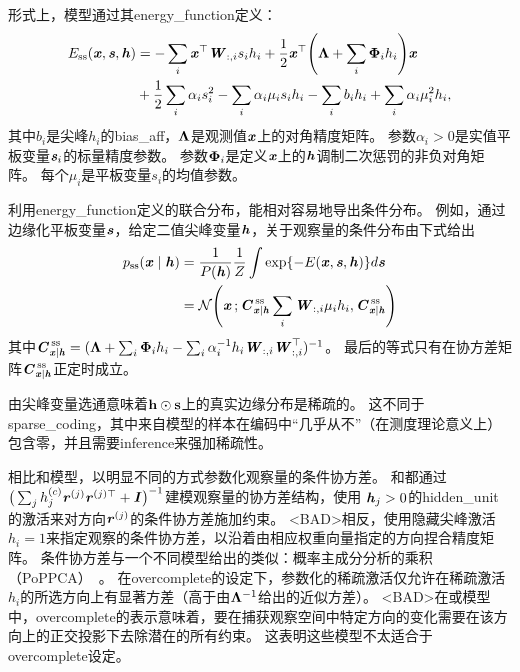 形式上，模型通过其\gls{energy_function}定义：
\begin{align}
 E_{\text{ss}}(\Vx, \Vs, \Vh) &= - \sum_i \Vx^\top \MW_{:,i} s_i h_i + \frac{1}{2} \Vx^\top
 \Bigg( \VLambda + \sum_i \VPhi_i h_i \Bigg) \Vx \\
 &+ \frac{1}{2} \sum_i \alpha_i s_i^2 - \sum_i \alpha_i \mu_i s_i h_i - \sum_i b_i h_i 
 + \sum_i \alpha_i \mu_i^2 h_i,
 \end{align}
其中$b_i$是尖峰$h_i$的\gls{bias_aff}，$\VLambda$是观测值$\Vx$上的对角精度矩阵。
参数$\alpha_i > 0$是实值平板变量$\Vs_i$的标量精度参数。
参数$\VPhi_i$是定义$\Vx$上的$\Vh$调制二次惩罚的非负对角矩阵。
每个$\mu_i$是平板变量$s_i$的均值参数。


利用\gls{energy_function}定义的联合分布，能相对容易地导出条件分布。
例如，通过边缘化平板变量$\Vs$，给定二值尖峰变量$\Vh$，关于观察量的条件分布由下式给出
\begin{align}
 p_{\text{ss}} (\Vx  \mid  \Vh) &= \frac{1}{P(\Vh)} \frac{1}{Z} \int \exp\{ -E(\Vx, \Vs, \Vh) \} d\Vs \\
 &= \CalN \Bigg( \Vx\,; \MC_{\Vx \mid \Vh}^{\,\text{ss}} \sum_i \MW_{:,i}\mu_i h_i, 
  \MC_{\Vx \mid \Vh}^{\,\text{ss}} \Bigg)
\end{align}
其中$ \MC_{\Vx \mid \Vh}^{\,\text{ss}} = (\VLambda + \sum_i \VPhi_i h_i 
-\sum_i \alpha_i^{-1} h_i \MW_{:,i}\MW_{:,i}^\top)^{-1}$。
最后的等式只有在协方差矩阵$\MC_{\Vx \mid \Vh}^{\,\text{ss}} $正定时成立。

由尖峰变量选通意味着$\RVh \odot \RVs$上的真实边缘分布是稀疏的。
这不同于\gls{sparse_coding}，其中来自模型的样本在编码中``几乎从不''（在测度理论意义上）包含零，并且需要\gls{inference}来强加稀疏性。


相比和模型，以明显不同的方式参数化观察量的条件协方差。
和都通过 $\big( \sum_j h_j^{(c)} \Vr^{(j)} \Vr^{(j)\top} + \MI \big)^{-1}$建模观察量的协方差结构，使用 $\Vh_j > 0$的\gls{hidden_unit}的激活来对方向$\Vr^{(j)}$的条件协方差施加约束。
<BAD>相反，使用隐藏尖峰激活$h_i = 1$来指定观察的条件协方差，以沿着由相应权重向量指定的方向捏合精度矩阵。
条件协方差与一个不同模型给出的类似：概率主成分分析的乘积（PoPPCA）~\citep{Williams2002}。
在\gls{overcomplete}的设定下，参数化的稀疏激活仅允许在稀疏激活$h_i$的所选方向上有显著方差（高于由$\VLambda^{-1}$给出的近似方差）。
<BAD>在或模型中，\gls{overcomplete}的表示意味着，要在捕获观察空间中特定方向的变化需要在该方向上的正交投影下去除潜在的所有约束。
这表明这些模型不太适合于\gls{overcomplete}设定。

